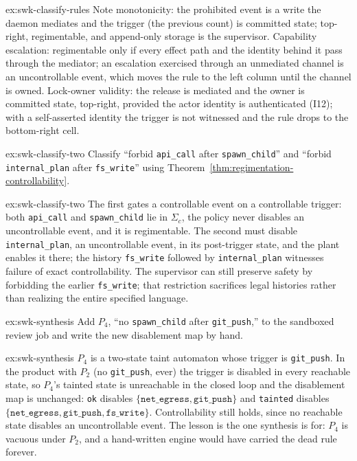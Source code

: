 \documentclass[11pt,a4paper]{article}
\theoremstyle{definition}
\theoremstyle{remark}
\begin{document}
\begin{pdsolution}{ex:swk-classify-rules}
Note monotonicity: the prohibited event is a write the daemon mediates and the trigger (the previous count) is committed state; top-right, regimentable, and append-only storage is the supervisor. Capability escalation: regimentable only if every effect path and the identity behind it pass through the mediator; an escalation exercised through an unmediated channel is an uncontrollable event, which moves the rule to the left column until the channel is owned. Lock-owner validity: the release is mediated and the owner is committed state, top-right, provided the actor identity is authenticated (I12); with a self-asserted identity the trigger is not witnessed and the rule drops to the bottom-right cell.
\end{pdsolution}
\begin{pdexercise}[kind=Check,rating=1]{ex:swk-classify-two}
Classify ``forbid \texttt{api\_call} after \texttt{spawn\_child}'' and ``forbid \texttt{internal\_plan} after \texttt{fs\_write}'' using Theorem~\ref{thm:regimentation-controllability}.
\end{pdexercise}
\begin{pdsolution}{ex:swk-classify-two}
The first gates a controllable event on a controllable trigger: both \texttt{api\_call} and \texttt{spawn\_child} lie in $\Sigma_c$, the policy never disables an uncontrollable event, and it is regimentable. The second must disable \texttt{internal\_plan}, an uncontrollable event, in its post-trigger state, and the plant enables it there; the history \texttt{fs\_write} followed by \texttt{internal\_plan} witnesses failure of exact controllability. The supervisor can still preserve
safety by forbidding the earlier \texttt{fs\_write}; that restriction sacrifices
legal histories rather than realizing the entire specified language.
\end{pdsolution}
\begin{pdexercise}[kind=Trace,rating=2]{ex:swk-synthesis}
Add $P_4$, ``no \texttt{spawn\_child} after \texttt{git\_push},'' to the sandboxed review job and write the new disablement map by hand.
\end{pdexercise}
\begin{pdsolution}{ex:swk-synthesis}
$P_4$ is a two-state taint automaton whose trigger is \texttt{git\_push}. In the product with $P_2$ (no \texttt{git\_push}, ever) the trigger is disabled in every reachable state, so $P_4$'s tainted state is unreachable in the closed loop and the disablement map is unchanged: \texttt{ok} disables $\{\texttt{net\_egress}, \texttt{git\_push}\}$ and \texttt{tainted} disables $\{\texttt{net\_egress}, \texttt{git\_push}, \texttt{fs\_write}\}$. Controllability still holds, since no reachable state disables an uncontrollable event. The lesson is the one synthesis is for: $P_4$ is vacuous under $P_2$, and a hand-written engine would have carried the dead rule forever.
\end{pdsolution}
\end{document}
